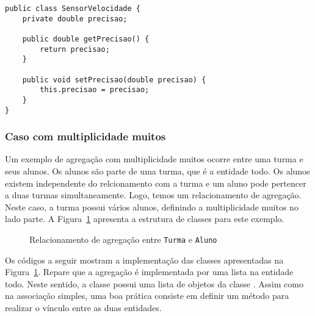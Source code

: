 \begin{verbatim}
public class SensorVelocidade {
	private double precisao;
	
	public double getPrecisao() {
		return precisao;
	}
	
	public void setPrecisao(double precisao) {
		this.precisao = precisao;
	}
}
\end{verbatim}

\subsubsection{Caso com multiplicidade muitos}

Um exemplo de agregação com multiplicidade muitos ocorre entre uma turma e seus alunos. Os alunos são parte de uma turma, que é a entidade todo. Os alunos existem independente do relcionamento com a turma e um aluno pode pertencer a duas turmas simultaneamente. Logo, temos um relacionamento de agregação. Neste caso, a turma possui vários alunos, definindo a multiplicidade muitos no lado parte. A Figura~\ref{fig:agregacao-turma-aluno} apresenta a estrutura de classes para este exemplo.

\begin{figure}[h]
	\centering
	
	
	\caption{Relacionamento de agregação entre \texttt{Turma} e \texttt{Aluno}}
	\label{fig:agregacao-turma-aluno}
\end{figure}
 
Os códigos a seguir mostram a implementação das classes apresentadas na Figura~\ref{fig:agregacao-turma-aluno}. Repare que a agregação é implementada por uma lista na entidade todo. Neste sentido, a classe  possui uma lista de objetos da classe . Assim como na associação simples, uma boa prática consiste em definir um método  para realizar o vínculo entre as duas entidades.

